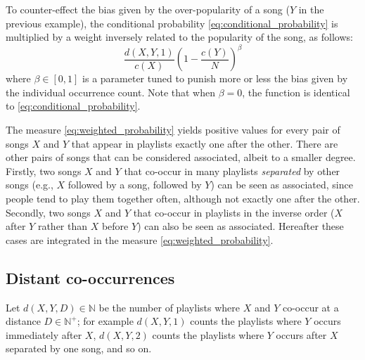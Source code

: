 To counter-effect the bias given by the over-popularity of a song ($Y$ in the previous example), the conditional probability \eqref{eq:conditional_probability} is multiplied by a weight inversely related to the popularity of the song, as follows:
\begin{equation}\label{eq:weighted_probability}
 \frac{d(X,Y,1)}{c(X)}\left(1-\frac{c(Y)}{N}\right)^\beta 
\end{equation}
where $\beta \in [0,1]$ is a parameter tuned to punish more or less the bias given by the individual occurrence count. 
Note that when $\beta = 0$, the function is identical to \eqref{eq:conditional_probability}. %


The measure \eqref{eq:weighted_probability} yields positive values for every pair of songs $X$ and $Y$ that appear in playlists exactly one after the other.
There are other pairs of songs that can be considered associated, albeit to a smaller degree. 
Firstly, two songs $X$ and $Y$ that co-occur in many playlists \emph{separated} by other songs (e.g., $X$ followed by a song, followed by $Y$) can be seen as associated, since people tend to play them together often, although not exactly one after the other.
Secondly, two songs $X$ and $Y$ that co-occur in playlists in the inverse order ($X$ after $Y$ rather than $X$ before $Y$) can also be seen as associated.
Hereafter these cases are integrated in the measure \eqref{eq:weighted_probability}.



\subsection{Distant co-occurrences} %
\label{sub:distance_of_the_occurrences}

Let $d(X,Y,D) \in \mathbb{N}$ be the number of playlists where $X$ and $Y$ co-occur at a distance $D \in \mathbb{N}^+$; for example $d(X,Y,1)$ counts the playlists where $Y$ occurs immediately after $X$, $d(X,Y,2)$ counts the playlists where $Y$ occurs after $X$ separated by one song, %
and so on.

